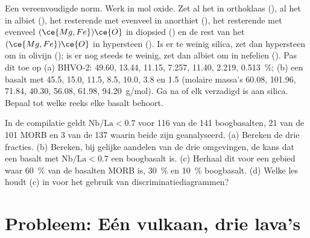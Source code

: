 \begin{exercise}[$\star\star\star$]\label{exo:b2:magmatic-series:11}
Een vereenvoudigde norm. Werk in mol oxide. Zet al het  in orthoklaas
(), al het  in albiet (), het
resterende  met evenveel  in anorthiet (), het
resterende  met evenveel $(\ce{Mg,Fe})\ce{O}$ in diopsied
() en de rest van het $(\ce{Mg,Fe})\ce{O}$ in hypersteen
(). Is er te weinig silica, zet dan hypersteen om in olivijn
(); is er nog steeds te weinig, zet dan albiet om in nefelien
(). Pas dit toe op (a) BHVO-2:  49.60,  13.44,
 11.15,  7.257,  11.40,  2.219, 
\qty{0.513}{\percent}; (b) een basalt met 45.5, 15.0, 11.5, 8.5, 10.0, 3.8 en 1.5 (molaire
massa's  60.08,  101.96,  71.84,  40.30, 
56.08,  61.98,  \qty{94.20}{g/mol}). Ga na of elk verzadigd is aan silica. Bepaal
tot welke reeks elke basalt behoort.
\end{exercise}

\begin{exercise}[$\star\star\star$]\label{exo:b2:magmatic-series:12}
In de compilatie geldt $\mathrm{Nb}/\mathrm{La} < 0.7$ voor 116 van de 141 boogbasalten,
21 van de 101 MORB en 3 van de 137  waarin beide zijn geanalyseerd. (a) Bereken de
drie fracties. (b) Bereken, bij gelijke aandelen van de drie omgevingen, de
kans dat een basalt met $\mathrm{Nb}/\mathrm{La} < 0.7$ een boogbasalt is. (c)
Herhaal dit voor een gebied waar \qty{60}{\percent} van de basalten MORB is, \qty{30}{\percent}
 en \qty{10}{\percent} boogbasalt. (d) Welke les houdt (c)
in voor het gebruik van discriminatiediagrammen?
\end{exercise}

\section{Probleem: Eén vulkaan, drie lava's}


